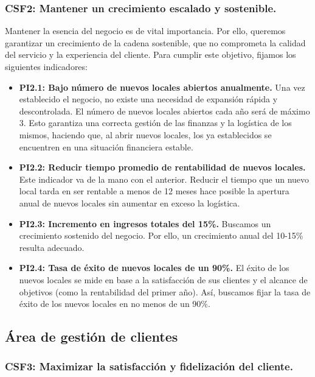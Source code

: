 \documentclass[12pt]{opticajnl}
\begin{document}
\subsubsection*{CSF2: Mantener un crecimiento escalado y sostenible.}

Mantener la esencia del negocio es de vital importancia. Por ello, queremos garantizar un crecimiento de la cadena sostenible, que no comprometa la calidad del servicio y la experiencia del cliente. Para cumplir este objetivo, fijamos los siguientes indicadores:

\begin{itemize}
    \item \textbf{PI2.1: Bajo número de nuevos locales abiertos anualmente.} Una vez establecido el negocio, no existe una necesidad de expansión rápida y descontrolada. El número de nuevos locales abiertos cada año será de máximo 3. Esto garantiza una correcta gestión de las finanzas y la logística de los mismos, haciendo que, al abrir nuevos locales, los ya establecidos se encuentren en una situación financiera estable.
    \item \textbf{PI2.2: Reducir tiempo promedio de rentabilidad de nuevos locales.} Este indicador va de la mano con el anterior. Reducir el tiempo que un nuevo local tarda en ser rentable a menos de 12 meses hace posible la apertura anual de nuevos locales sin aumentar en exceso la logística.
    \item \textbf{PI2.3: Incremento en ingresos totales del 15\%.} Buscamos un crecimiento sostenido del negocio. Por ello, un crecimiento anual del 10-15\% resulta adecuado.
    \item \textbf{PI2.4: Tasa de éxito de nuevos locales de un 90\%.} El éxito de los nuevos locales se mide en base a la satisfacción de sus clientes y el alcance de objetivos (como la rentabilidad del primer año). Así, buscamos fijar la tasa de éxito de los nuevos locales en no menos de un 90\%.  
\end{itemize}






\subsection{Área de gestión de clientes}

\subsubsection*{CSF3: Maximizar la satisfacción y fidelización del cliente.}
\end{document}
